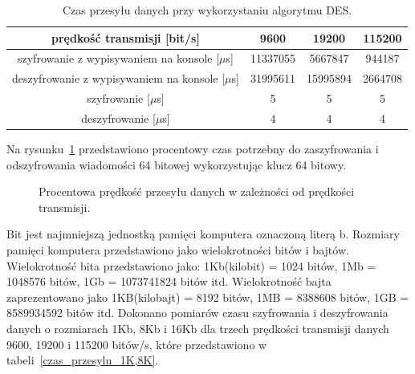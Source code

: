 \documentclass[12p]{article}
\begin{document}
\begin{table}[H]
\centering
\begin{tabular}{|c|c|c|c|}
\hline
prędkość transmisji [bit/s] &9600 &19200 &115200\\ \hline
szyfrowanie z wypisywaniem na konsole [$\mu$s]&11337055 &5667847 &944187\\ \hline
deszyfrowanie z wypisywaniem na konsole [$\mu$s]&31995611&15995894 &2664708\\ \hline
szyfrowanie [$\mu$s]&5&5&5\\ \hline
deszyfrowanie [$\mu$s]&4&4&4\\ \hline
\end{tabular}
\caption{Czas przesyłu danych przy wykorzystaniu algorytmu DES.}\label{czas_przesylu}
\end{table}

Na rysunku~\ref{czas_przesylu_procent} przedstawiono procentowy czas potrzebny do zaszyfrowania i odszyfrowania wiadomości 64 bitowej wykorzystując klucz 64 bitowy. 

\begin{figure}[H]
\centering
{}
\caption{Procentowa prędkość przesyłu danych w zależności od prędkości transmisji.}\label{czas_przesylu_procent}
\end{figure}

Bit jest najmniejszą jednostką pamięci komputera oznaczoną literą b. Rozmiary pamięci komputera przedstawiono jako wielokrotności bitów i bajtów. Wielokrotność bita przedstawiono jako: 1Kb(kilobit) = 1024 bitów, 1Mb = 1048576 bitów, 1Gb = 1073741824 bitów itd. Wielokrotność bajta zaprezentowano jako 1KB(kilobajt) = 8192 bitów, 1MB = 8388608 bitów, 1GB = 8589934592 bitów itd. Dokonano pomiarów czasu szyfrowania i deszyfrowania danych o rozmiarach 1Kb, 8Kb i 16Kb dla trzech prędkości transmisji danych 9600, 19200 i 115200 bitów/s, które przedstawiono w tabeli~\ref{czas_przesylu_1K,8K}. 
\end{document}
